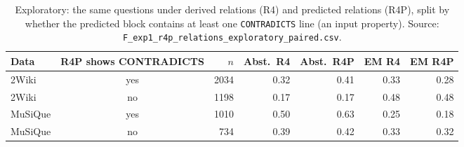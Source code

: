 \begin{table}[t]
\centering
\footnotesize
\begin{adjustbox}{max width=\linewidth}
\begin{tabular}{@{}lcrrrrr@{}}
\toprule
Data & R4P shows CONTRADICTS & $n$ & Abst.\ R4 & Abst.\ R4P & EM R4 & EM R4P \\
\midrule
2Wiki & yes & 2034 & 0.32 & 0.41 & 0.33 & 0.28 \\
2Wiki & no & 1198 & 0.17 & 0.17 & 0.48 & 0.48 \\
MuSiQue & yes & 1010 & 0.50 & 0.63 & 0.25 & 0.18 \\
MuSiQue & no & 734 & 0.39 & 0.42 & 0.33 & 0.32 \\
\bottomrule
\end{tabular}
\end{adjustbox}
\caption{Exploratory: the same questions under derived relations (R4) and predicted relations (R4P), split by whether the predicted block contains at least one \texttt{CONTRADICTS} line (an input property). Source: \texttt{F\_exp1\_r4p\_relations\_exploratory\_paired.csv}.}
\label{tab:r4p}
\end{table}
